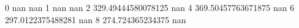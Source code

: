 0 nan nan
1 nan nan
2 329.49444580078125 nan
4 369.50457763671875 nan
6 297.0122375488281 nan
8 274.724365234375 nan
